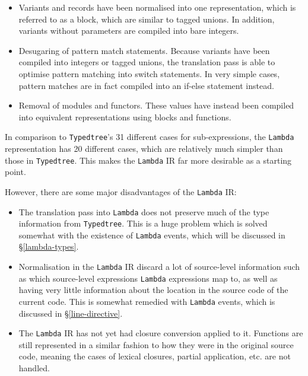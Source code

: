 \begin{itemize}

\item Variants and records have been normalised into one representation, which
    is referred to as a block, which are similar to tagged unions. In addition,
    variants without parameters are compiled into bare integers.

\item Desugaring of pattern match statements. Because variants have been
    compiled into integers or tagged unions, the translation pass is able to
    optimise pattern matching into switch statements. In very simple cases,
    pattern matches are in fact compiled into an if-else statement instead.

\item Removal of modules and functors. These values have instead been compiled
    into equivalent representations using blocks and functions.

\end{itemize}

In comparison to \texttt{Typedtree}'s 31 different cases for sub-expressions, 
the \texttt{Lambda} representation has 20 different cases, which are relatively 
much simpler than those in \texttt{Typedtree}. This makes the \texttt{Lambda} 
IR far more desirable as a starting point.

However, there are some major disadvantages of the \texttt{Lambda} IR:

\begin{itemize}

\item The translation pass into \texttt{Lambda} does not preserve much of the
    type information from \texttt{Typedtree}. This is a huge problem which is
    solved somewhat with the existence of \texttt{Lambda} events, which will be
    discussed in \S\ref{lambda-types}.

\item Normalisation in the \texttt{Lambda} IR discard a lot of source-level
    information such as which source-level expressions \texttt{Lambda}
    expressions map to, as well as having very little information about the
    location in the source code of the current code. This is somewhat remedied
    with \texttt{Lambda} events, which is discussed in \S\ref{line-directive}.

\item The \texttt{Lambda} IR has not yet had closure conversion applied to it.
    Functions are still represented in a similar fashion to how they were in the
    original source code, meaning the cases of lexical closures, partial
    application, etc. are not handled.

\end{itemize}

